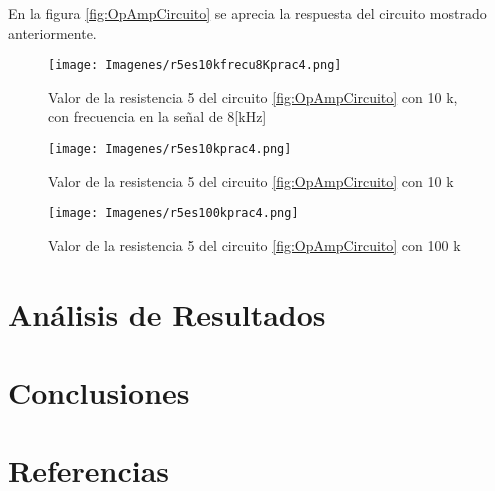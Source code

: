 \documentclass[]{article}
\begin{document}
En la figura \ref{fig:OpAmpCircuito} se aprecia la respuesta del circuito mostrado anteriormente.\\


\begin{figure}[h!]
	\centering
	\texttt{[image: Imagenes/r5es10kfrecu8Kprac4.png]}
	\caption{Valor de la resistencia 5 del circuito \ref{fig:OpAmpCircuito} con 10 k, con frecuencia en la señal de 8[kHz]}
	\label{fig:8K}
\end{figure}

\begin{figure}[h!]
	\centering
	\texttt{[image: Imagenes/r5es10kprac4.png]}
	\caption{Valor de la resistencia 5 del circuito \ref{fig:OpAmpCircuito} con 10 k}
	\label{fig:noFrec}
\end{figure}

\begin{figure}[h!]
	\centering
	\texttt{[image: Imagenes/r5es100kprac4.png]}
	\caption{Valor de la resistencia 5 del circuito \ref{fig:OpAmpCircuito} con 100 k}
	\label{fig:100kres}
\end{figure}



\section{Análisis de Resultados}



\section{Conclusiones}


\section{Referencias}



\end{document}
